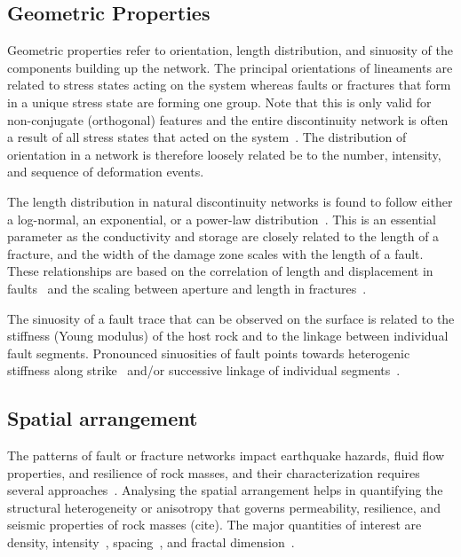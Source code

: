 \documentclass[a4paper,fleqn]{cas-sc}
\begin{document}
\subsection{Geometric Properties}
Geometric properties refer to orientation, length distribution, and sinuosity of the components building up the network. The principal orientations of lineaments are related to stress states acting on the system whereas faults or fractures that form in a unique stress state are forming one group. Note that this is only valid for non-conjugate (orthogonal) features and the entire discontinuity network is often a result of all stress states that acted on the system~\citep{Maerten2016, Lei2018}. The distribution of orientation in a network is therefore loosely related be to the number, intensity, and sequence of deformation events.

The length distribution in natural discontinuity networks is found to follow either a log-normal, an exponential, or a power-law distribution~\citep{Zeeb2013, Healy2017}. This is an essential parameter as the conductivity and storage are closely related to the length of a fracture, and the width of the damage zone scales with the length of a fault. These relationships are based on the correlation of length and displacement in faults~\citep{Gudmundsson2013} and the scaling between aperture and length in fractures~\citep{Renshaw1997, Mayrhofer2019}.

The sinuosity of a fault trace that can be observed on the surface is related to the stiffness (Young modulus) of the host rock and to the linkage between individual fault segments. Pronounced sinuosities of fault points towards heterogenic stiffness along strike~\citep{Bridwell1975} and/or successive linkage of individual segments~\citep{vonHagke2019}. 

\subsection{Spatial arrangement}
The patterns of fault or fracture networks impact earthquake hazards, fluid flow properties, and resilience of rock masses, and their characterization requires several approaches~\citep{Laubach2018, Laubach2018b}. Analysing the spatial arrangement helps in quantifying the structural heterogeneity or anisotropy that governs permeability, resilience, and seismic properties of rock masses (cite). The major quantities of interest are density, intensity~\citep{Rohrbaugh2002, Zeeb2013, Watkins2015}, spacing~\citep{Zusa2017}, and fractal dimension~\citep{Bour1999, Wilson2000, Wilson2001}.
\end{document}
